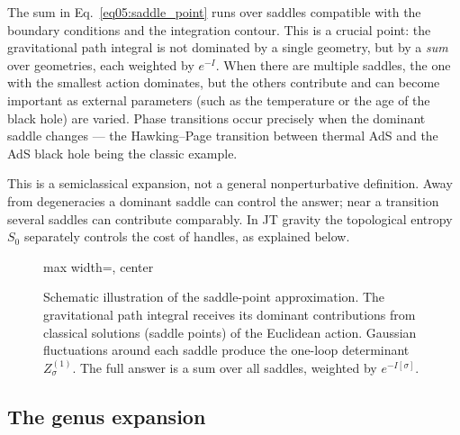 \documentclass[11pt,letterpaper]{article}
\theoremstyle{plain}
\theoremstyle{definition}
\theoremstyle{remark}
\begin{document}
The sum in Eq.~\eqref{eq05:saddle_point} runs over saddles compatible
with the boundary conditions and the integration contour.  This is a crucial point: the gravitational path integral
is not dominated by a single geometry, but by a \emph{sum} over geometries,
each weighted by $e^{-I}$.  When there are multiple saddles, the one with the
smallest action dominates, but the others contribute and can become important as
external parameters (such as the temperature or the age of the black hole) are
varied.  Phase transitions occur precisely when the dominant saddle changes ---
the Hawking--Page transition \citep{hawkingpage1983} between thermal AdS and the
AdS black hole being the classic example.

This is a semiclassical expansion, not a general nonperturbative
definition. Away from degeneracies a dominant saddle can control the answer;
near a transition several saddles can contribute comparably. In JT gravity
the topological entropy $S_0$ separately controls the cost of handles, as
explained below.

\begin{figure}[t]
\centering
\begin{adjustbox}{max width=\textwidth, center}
\end{adjustbox}
\caption{Schematic illustration of the saddle-point approximation.  The
gravitational path integral receives its dominant contributions from classical
solutions (saddle points) of the Euclidean action.  Gaussian fluctuations around
each saddle produce the one-loop determinant $Z^{(1)}_\sigma$.  The full answer
is a sum over all saddles, weighted by $e^{-I[\sigma]}$.}\label{fig05:saddle_point}
\end{figure}


\subsection{The genus expansion}\label{subsec05:genus_expansion}
\end{document}
